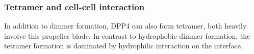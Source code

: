\subsubsection{Tetramer and cell-cell interaction}

In addition to dimmer formation, DPP4 can also form tetramer, both heavily involve this propeller blade. In contrast to hydrophobic dimmer formation, the tetramer formation is dominated by hydrophilic interaction on the interface.~\cite{Engel_2003} 